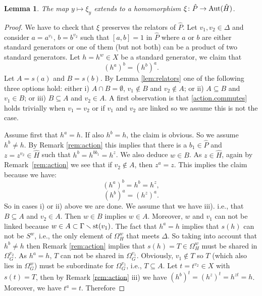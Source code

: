 \documentclass[10pt]{amsart}
\newtheorem{lemma}[theorem]{Lemma}
\theoremstyle{definition}
\newcommand{\Aut}{{\rm Aut}}
\newcommand{\st}{{\rm st}}
\theoremstyle{definition}
\numberwithin{equation}{section}
\begin{document}
\begin{lemma}\label{lem:welldef2} The map $y\mapsto\xi_y$ extends to a homomorphism $\xi\colon \hat P\to\Aut(\hat H)$.
\end{lemma}
\begin{proof} We have to check that $\xi$ preserves the relators of $\hat P$. Let $v_1,v_2\in\Delta$ and consider $a=a^{v_1}$, $b=b^{v_2}$ such that $[a,b]=1$ in $\hat P$ where $a$ or $b$ are either standard generators or one of them  (but not both) can be a product of two standard generators. Let $h=h^w\in X$ be a standard generator, we claim that \begin{equation} \label{action.commutes} (h^a)^b=(h^b)^a. \end{equation}
Let $A=s(a)$ and $B=s(b)$. By Lemma \ref{lem:relators} one of the following three options hold: either i) $A\cap B=\emptyset$, $v_1\not\in B$ and $v_2\not\in A$; or ii) $A\subseteq B$ and $v_1\in B$; or iii) $B\subseteq A$ and $v_2\in A$. A first observation is that \eqref{action.commutes} holds trivially when $v_1=v_2$ or if $v_1$ and $v_2$ are linked so we assume this is not the case.

Assume first that 
 $h^a=h$. If also $h^b=h$, the claim is obvious. So we assume $h^b\neq h$. By Remark \ref{rem:action} this implies that there is a $b_1\in\hat P$ and $z=z^{v_2}\in\hat H$ such that $h^b=h^{bb_1}=h^z$. We also deduce $w\in B$. As $z\in\hat H$, again by Remark~\ref{rem:action} we see that if $v_2\not\in A$, then $z^a=z$.
This implies the claim because we have:
\[(h^a)^b=h^b=h^z,\]
\[(h^b)^a=(h^z)^a.\]
So in cases i) or ii) above we are done. We assume that we have iii). i.e., that  $B\subseteq A$ and $v_2\in A$. Then $w\in B$ implies $w\in A$. Moreover, $w$ and $v_1$ can not be linked %
because $w \in A \subset \Gamma \smallsetminus \st(v_1)$. The fact that $h^a=h$ implies that $s(h)$ can not be $S^w$, i.e., the only element of $\Omega^w_H$ that meets $\Delta$. So taking into account that $h^b\neq h$ then Remark \ref{rem:action} implies that $s(h)=T\in\Omega^w_H$ must be shared in $\Omega_G^{v_2}$. As $h^a=h$, $T$ can not be shared in $\Omega_G^{v_1}$. %
Obviously, $v_1\not\in T$ so $T$ (which also lies in $\Omega_G^{w}$) must be subordinate for $\Omega_G^{v_1}$, i.e., $T\subseteq A$. Let $t=t^{v_2}\in X$ with $s(t)=T$, then by Remark \ref{rem:action} iii) we have $(h^b)^t=(h^z)^t=h^{zt}=h$.  Moreover, we have $t^a=t$. Therefore


\end{proof}
\end{document}

